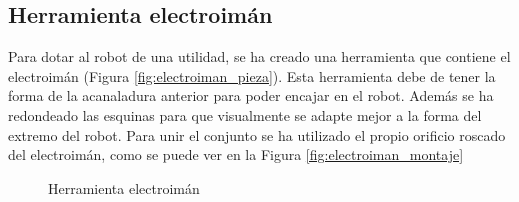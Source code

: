 \subsection{Herramienta electroimán}
\noindent Para dotar al robot de una utilidad, se ha creado una herramienta que contiene el electroimán (Figura \ref{fig:electroiman_pieza}). Esta herramienta debe de tener la forma 
de la acanaladura anterior para poder encajar en el robot. Además se ha redondeado las esquinas para que visualmente se adapte mejor a la 
forma del extremo del robot. Para unir el conjunto se ha utilizado el propio orificio roscado del electroimán, como se puede ver en la Figura 
\ref{fig:electroiman_montaje}

\begin{figure} [ht!]
  \centering    

  
  \caption{Herramienta electroimán}
\end{figure}

\newpage

